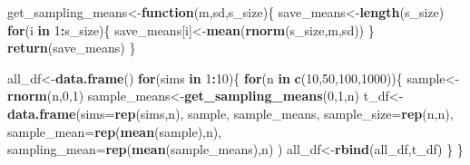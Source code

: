 \documentclass[
]{book}
\newenvironment{Shaded}{\begin{snugshade}}{\end{snugshade}}
\newcommand{\AttributeTok}[1]{\textcolor[rgb]{0.13,0.29,0.53}{#1}}
\newcommand{\ControlFlowTok}[1]{\textcolor[rgb]{0.13,0.29,0.53}{\textbf{#1}}}
\newcommand{\DecValTok}[1]{\textcolor[rgb]{0.00,0.00,0.81}{#1}}
\newcommand{\FunctionTok}[1]{\textcolor[rgb]{0.13,0.29,0.53}{\textbf{#1}}}
\newcommand{\NormalTok}[1]{#1}
\newcommand{\OtherTok}[1]{\textcolor[rgb]{0.56,0.35,0.01}{#1}}
\newcommand{\SpecialCharTok}[1]{\textcolor[rgb]{0.81,0.36,0.00}{\textbf{#1}}}
\begin{document}
\begin{Shaded}
\begin{Highlighting}[]
\NormalTok{get\_sampling\_means}\OtherTok{\textless{}{-}}\ControlFlowTok{function}\NormalTok{(m,sd,s\_size)\{}
\NormalTok{  save\_means}\OtherTok{\textless{}{-}}\FunctionTok{length}\NormalTok{(s\_size)}
  \ControlFlowTok{for}\NormalTok{(i }\ControlFlowTok{in} \DecValTok{1}\SpecialCharTok{:}\NormalTok{s\_size)\{}
\NormalTok{    save\_means[i]}\OtherTok{\textless{}{-}}\FunctionTok{mean}\NormalTok{(}\FunctionTok{rnorm}\NormalTok{(s\_size,m,sd))}
\NormalTok{  \}}
  \FunctionTok{return}\NormalTok{(save\_means)}
\NormalTok{\}}

\NormalTok{all\_df}\OtherTok{\textless{}{-}}\FunctionTok{data.frame}\NormalTok{()}
\ControlFlowTok{for}\NormalTok{(sims }\ControlFlowTok{in} \DecValTok{1}\SpecialCharTok{:}\DecValTok{10}\NormalTok{)\{}
  \ControlFlowTok{for}\NormalTok{(n }\ControlFlowTok{in} \FunctionTok{c}\NormalTok{(}\DecValTok{10}\NormalTok{,}\DecValTok{50}\NormalTok{,}\DecValTok{100}\NormalTok{,}\DecValTok{1000}\NormalTok{))\{}
\NormalTok{    sample}\OtherTok{\textless{}{-}}\FunctionTok{rnorm}\NormalTok{(n,}\DecValTok{0}\NormalTok{,}\DecValTok{1}\NormalTok{)}
\NormalTok{    sample\_means}\OtherTok{\textless{}{-}}\FunctionTok{get\_sampling\_means}\NormalTok{(}\DecValTok{0}\NormalTok{,}\DecValTok{1}\NormalTok{,n)}
\NormalTok{    t\_df}\OtherTok{\textless{}{-}}\FunctionTok{data.frame}\NormalTok{(}\AttributeTok{sims=}\FunctionTok{rep}\NormalTok{(sims,n),}
\NormalTok{                     sample,}
\NormalTok{                     sample\_means,}
                     \AttributeTok{sample\_size=}\FunctionTok{rep}\NormalTok{(n,n),}
                     \AttributeTok{sample\_mean=}\FunctionTok{rep}\NormalTok{(}\FunctionTok{mean}\NormalTok{(sample),n),}
                     \AttributeTok{sampling\_mean=}\FunctionTok{rep}\NormalTok{(}\FunctionTok{mean}\NormalTok{(sample\_means),n)}
\NormalTok{                     )}
\NormalTok{    all\_df}\OtherTok{\textless{}{-}}\FunctionTok{rbind}\NormalTok{(all\_df,t\_df)}
\NormalTok{  \}}
\NormalTok{\}}



\end{Highlighting}
\end{Shaded}
\end{document}
